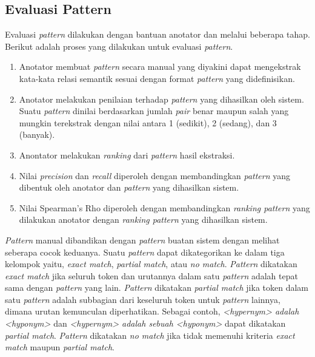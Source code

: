 \subsection{Evaluasi Pattern}
Evaluasi \textit{pattern} dilakukan dengan bantuan anotator dan melalui beberapa tahap. Berikut adalah proses yang dilakukan untuk evaluasi \textit{pattern}.
\begin{enumerate}
  \item Anotator membuat \textit{pattern} secara manual yang diyakini dapat mengekstrak kata-kata relasi semantik sesuai dengan format \textit{pattern} yang didefinisikan.
  \item Anotator melakukan penilaian terhadap \textit{pattern} yang dihasilkan oleh sistem. Suatu \textit{pattern} dinilai berdasarkan jumlah \textit{pair} benar maupun salah yang mungkin terekstrak dengan nilai antara 1 (sedikit), 2 (sedang), dan 3 (banyak).
  \item Anontator melakukan \textit{ranking} dari \textit{pattern} hasil ekstraksi.
  \item Nilai \textit{precision} dan \textit{recall} diperoleh dengan membandingkan \textit{pattern} yang dibentuk oleh anotator dan \textit{pattern} yang dihasilkan sistem.
  \item Nilai Spearman's Rho diperoleh dengan membandingkan \textit{ranking pattern} yang dilakukan anotator dengan \textit{ranking pattern} yang dihasilkan sistem.
\end{enumerate}

\textit{Pattern} manual dibandikan dengan \textit{pattern} buatan sistem dengan melihat seberapa cocok keduanya. Suatu \textit{pattern} dapat dikategorikan ke dalam tiga kelompok yaitu, \textit{exact match}, \textit{partial match}, atau \textit{no match}. \textit{Pattern} dikatakan \textit{exact match} jika seluruh token dan urutannya dalam satu \textit{pattern} adalah tepat sama dengan \textit{pattern} yang lain. \textit{Pattern} dikatakan \textit{partial match} jika token dalam satu \textit{pattern} adalah subbagian dari keseluruh token untuk \textit{pattern} lainnya, dimana urutan kemunculan diperhatikan. Sebagai contoh, \textit{<hypernym> adalah <hyponym>} dan \textit{<hypernym> adalah sebuah <hyponym>} dapat dikatakan \textit{partial match}. \textit{Pattern} dikatakan \textit{no match} jika tidak memenuhi kriteria \textit{exact match} maupun \textit{partial match}.

